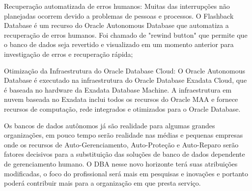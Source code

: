 \begin{alineas}
\item Recuperação automatizada de erros humanos: Muitas das interrupções não planejadas ocorrem devido a problemas de pessoas e processos. O Flashback Database é um recurso do Oracle Autonomous Database que automatiza a recuperação de erros humanos. Foi chamado de "rewind button" que permite que o banco de dados seja revertido e visualizado em um momento anterior para investigação de erros e recuperação rápida;

\item Otimização da Infraestrutura do Oracle Database Cloud: O Oracle Autonomous Database é executado na infraestrutura do Oracle Database Exadata Cloud, que é baseada no hardware da Exadata Database Machine. A infraestrutura em nuvem baseada no Exadata inclui todos os recursos do Oracle MAA e fornece recursos de computação, rede integrados e otimizados para o Oracle Database.
\end{alineas} 


Os bancos de dados autônomos já são realidade para algumas grandes organizações, em pouco tempo serão realidade nas médias e pequenas empresas onde os recursos de Auto-Gerenciamento, Auto-Proteção e Auto-Reparo serão fatores decisivos para a substituição das soluções de banco de dados dependente de gerenciamento humano. O DBA nesse novo horizonte terá suas atribuições modificadas, o foco do profissional será mais em pesquisas e inovações e portanto poderá contribuir mais para a organização em que presta serviço.


